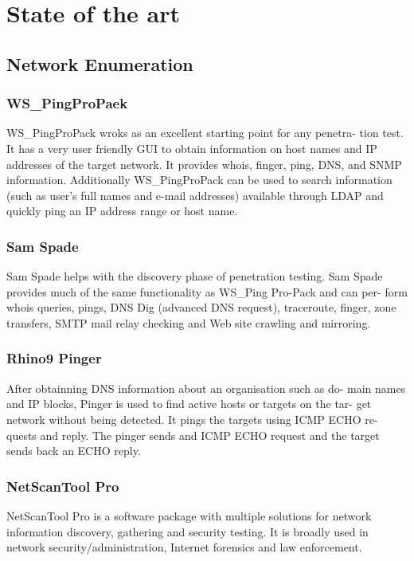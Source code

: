 \chapter{State of the art}

\section{Network Enumeration}

\subsection{WS_PingProPaek}

WS_PingProPack wroks as an excellent starting point for any penetra-
tion test. It has a very user friendly GUI to obtain information on host names and IP
addresses of the target network. It provides whois, finger, ping, DNS, and SNMP
information. Additionally WS_PingProPack can be used to search information
(such as user's full names and e-mail addresses) available through LDAP and
quickly ping an IP address range or host name.


\subsection{Sam Spade}

Sam Spade helps with the discovery phase of penetration testing. Sam
Spade provides much of the same functionality as WS_Ping Pro-Pack and can per-
form whois queries, pings, DNS Dig (advanced DNS request), traceroute, finger,
zone transfers, SMTP mail relay checking and Web site crawling and mirroring.

\subsection{Rhino9 Pinger}

After obtainning DNS information about an organisation such as do-
main names and IP blocks, Pinger is used to find active hosts or targets on the tar-
get network without being detected. It pings the targets using ICMP ECHO re-
quests and reply. The pinger sends and ICMP ECHO request and the target sends
back an ECHO reply.

\subsection{NetScanTool Pro}

NetScanTool Pro is a software package with multiple solutions for
network information discovery, gathering and security testing. It is broadly used
in network security/administration, Internet forensics and law enforcement.

